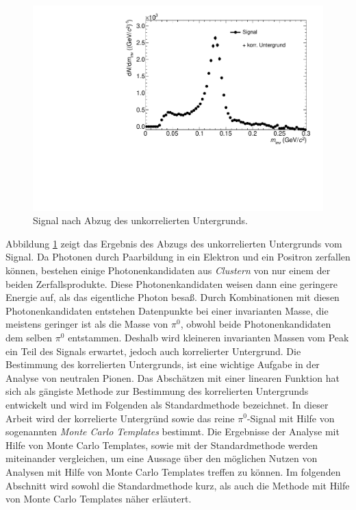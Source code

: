 \begin{figure}[tbp]
\centering
\includegraphics[width=.75\linewidth]{hInvMass_Data.pdf}
\caption{Signal nach Abzug des unkorrelierten Untergrunds.}
\label{figInvMass_Data}
\end{figure}
\newline
Abbildung \ref{figInvMass_Data} zeigt das Ergebnis des Abzugs des unkorrelierten Untergrunds vom Signal.
Da Photonen durch Paarbildung in ein Elektron und ein Positron zerfallen k\"onnen, bestehen einige Photonenkandidaten aus \textit{Clustern} von nur einem der beiden Zerfallsprodukte.
Diese Photonenkandidaten weisen dann eine geringere Energie auf, als das eigentliche Photon besa{\ss}.
Durch Kombinationen mit diesen Photonenkandidaten entstehen Datenpunkte bei einer invarianten Masse, die meistens geringer ist als die Masse von $\pi^{0}$, obwohl beide Photonenkandidaten dem selben $\pi^{0}$ entstammen.
Deshalb wird kleineren invarianten Massen vom Peak ein Teil des Signals erwartet, jedoch auch korrelierter Untergrund.
\newline
Die Bestimmung des korrelierten Untergrunds, ist eine wichtige Aufgabe in der Analyse von neutralen Pionen.
Das Absch\"atzen mit einer linearen Funktion hat sich als g\"angiste Methode zur Bestimmung des korrelierten Untergrunds entwickelt und wird im Folgenden als Standardmethode bezeichnet.
In dieser Arbeit wird der korrelierte Untergr\"und sowie das reine $\pi^{0}$-Signal mit Hilfe von sogenannten \textit{Monte Carlo Templates} bestimmt.
Die Ergebnisse der Analyse mit Hilfe von Monte Carlo Templates, sowie mit der Standardmethode werden miteinander vergleichen, um eine Aussage \"uber den m\"oglichen Nutzen von Analysen mit Hilfe von Monte Carlo Templates treffen zu k\"onnen.
Im folgenden Abschnitt wird sowohl die Standardmethode kurz, als auch die Methode mit Hilfe von Monte Carlo Templates n\"aher erl\"autert.